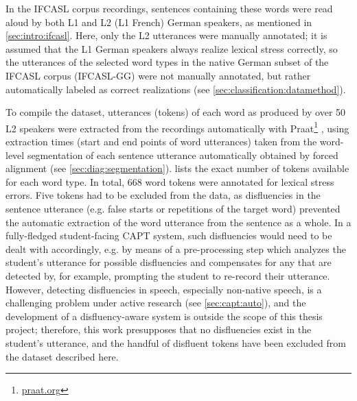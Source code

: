 	In the IFCASL corpus recordings, sentences containing these words were read aloud by both L1 and L2 (L1 French) German speakers, as mentioned in \cref{sec:intro:ifcasl}. Here, only the L2 utterances were manually annotated; it is assumed that the L1 German speakers always realize lexical stress correctly, so the utterances of the selected word types in the native German subset of the IFCASL corpus (IFCASL-GG) were not manually annotated, but rather automatically labeled as correct realizations (see \cref{sec:classification:datamethod}).
	
	
	To compile the dataset, utterances (tokens) of each word as produced by over 50 L2 speakers were extracted from the recordings automatically with Praat\footnote{\url{praat.org}} \parencite{Boersma2014}, using extraction times (start and end points of word utterances) taken from the word-level segmentation of each sentence utterance automatically obtained by forced alignment (see \cref{sec:diag:segmentation}).
	 lists the exact number of tokens available for each word type. In total, 
	668 word tokens were annotated for lexical stress errors. 
	Five tokens had to be excluded from the data, as disfluencies in the sentence utterance (e.g. false starts or repetitions of the target word) prevented the automatic extraction of the word utterance from the sentence as a whole. In a fully-fledged student-facing CAPT system, such disfluencies would need to be dealt with accordingly, e.g. by means of a pre-processing step which analyzes the student's utterance for possible disfluencies and compensates for any that are detected by, for example, prompting the student to re-record their utterance. However, detecting disfluencies in speech, especially non-native speech, is a challenging problem under active research 
	(see \cref{sec:capt:auto}),
	and the development of a  disfluency-aware system is outside the scope of this thesis project; therefore, this work presupposes that no disfluencies exist in the student's utterance, and the handful of disfluent tokens have been excluded from the dataset described here.
	
